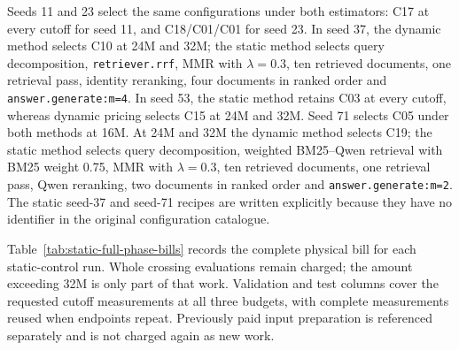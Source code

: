 Seeds 11 and 23 select the same configurations under both estimators: C17 at
every cutoff for seed 11, and C18/C01/C01 for seed 23. In seed 37, the dynamic
method selects C10 at 24M and 32M; the static method selects query decomposition,
\texttt{retriever.rrf}, MMR with $\lambda=0.3$, ten retrieved documents, one
retrieval pass, identity reranking, four documents in ranked order and
\texttt{answer.generate:m=4}. In seed 53, the static method retains C03 at
every cutoff, whereas dynamic pricing selects C15 at 24M and 32M.
Seed 71 selects C05 under both methods at 16M. At 24M and 32M the dynamic
method selects C19; the static method selects query decomposition, weighted
BM25--Qwen retrieval with BM25 weight 0.75, MMR with $\lambda=0.3$, ten
retrieved documents, one retrieval pass, Qwen reranking, two documents in
ranked order and \texttt{answer.generate:m=2}. The static seed-37 and seed-71
recipes are written explicitly because they have no identifier in the
original configuration catalogue.

\begin{table}[t]
\centering\small
\caption{Completed paired seeds for the AgentUCT-StaticFull ablation. Test F1 is
in percent and is directly compared across methods;
$N_{\rm dyn}$/$N_{\rm stat}$ count affordable complete evaluations. Both
methods use the live execution cache; only the selection-cost estimator is
frozen in AgentUCT-StaticFull. Reused endpoints across cutoffs are correlated
measurements, not additional independent trials. All five planned paired
seeds are complete.}
\label{tab:completed-static-full-paired}

\end{table}

Table~\ref{tab:static-full-phase-bills} records the complete physical bill for
each static-control run. Whole crossing evaluations remain charged; the
amount exceeding 32M is only part of that work. Validation and test columns
cover the requested cutoff measurements at all three budgets, with complete
measurements reused when endpoints repeat. Previously paid input preparation
is referenced separately and is not charged again as new work.

\begin{table}[t]
\centering\small\setlength{\tabcolsep}{4pt}
\caption{AgentUCT-StaticFull phase bills in M weighted-token units. Full search
includes the entire crossing evaluation; retained cost excludes it from the
32M snapshot. Overshoot is full search minus 32M. Validation and test include
the three-cutoff measurement campaign. Paid input preparation is a reference
to prior physical work, not a new zero-cost preparation claim.}
\label{tab:static-full-phase-bills}

\end{table}

